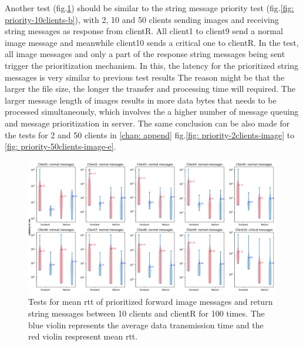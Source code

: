 Another test (fig.\ref{fig: priority-10clients-d}) should be similar to the string message priority test (fig.\ref{fig: priority-10clients-b}), 
with 2, 10 and 50 clients sending images and receiving string messages as response 
from clientR. 
All client1 to client9 send a normal image message and meanwhile 
client10 sends a critical one to clientR. 
In the test, all image messages and only a part of the response string messages 
being sent trigger the prioritization mechanism.  In this, the latency for 
the prioritized string messages is very similar to previous test results
The reason might be that the larger the file size, the longer the transfer 
and processing time will required. The larger message length of images 
results in more data bytes 
that needs to be processed simultaneously, which involves the a higher number of 
message queuing and message prioritization in server. The same conclusion can be 
also made for the tests for 2 and 50 clients in \ref{chap: append} fig.\ref{fig: priority-2clients-image} 
to \ref{fig: priority-50clients-image-e}.


\begin{figure}
    \includegraphics[width=\textheight]{figures/tests/priority_tests/log_violin_10clients_image_priority.png}\hfill 
    \caption{Tests for mean \gls{rtt} of prioritized forward image messages and return string messages between 10 clients 
    and clientR for 100 times. The blue violin represents the average data transmission time and the red violin 
    respresent mean \gls{rtt}.} \label{fig: priority-10clients-d}
\end{figure}


